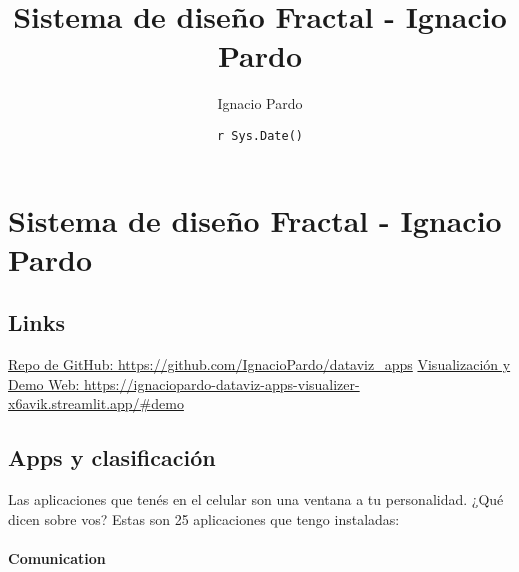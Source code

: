 \documentclass[
]{article}
\title{Sistema de diseño Fractal - Ignacio Pardo}
\author{Ignacio Pardo}
\date{\texttt{r\ Sys.Date()}}
\begin{document}
\maketitle

\hypertarget{sistema-de-diseuxf1o-fractal---ignacio-pardo}{%
\section{Sistema de diseño Fractal - Ignacio
Pardo}\label{sistema-de-diseuxf1o-fractal---ignacio-pardo}}

\hypertarget{links}{%
\subsection{Links}\label{links}}

\href{https://github.com/IgnacioPardo/dataviz_apps}{Repo de GitHub:
https://github.com/IgnacioPardo/dataviz\_apps}
\href{https://ignaciopardo-dataviz-apps-visualizer-x6avik.streamlit.app/\#demo}{Visualización
y Demo Web:
https://ignaciopardo-dataviz-apps-visualizer-x6avik.streamlit.app/\#demo}

\hypertarget{apps-y-clasificaciuxf3n}{%
\subsection{Apps y clasificación}\label{apps-y-clasificaciuxf3n}}

Las aplicaciones que tenés en el celular son una ventana a tu
personalidad. ¿Qué dicen sobre vos? Estas son 25 aplicaciones que tengo
instaladas:

\hypertarget{comunication}{%
\paragraph{Comunication}\label{comunication}}
\end{document}
